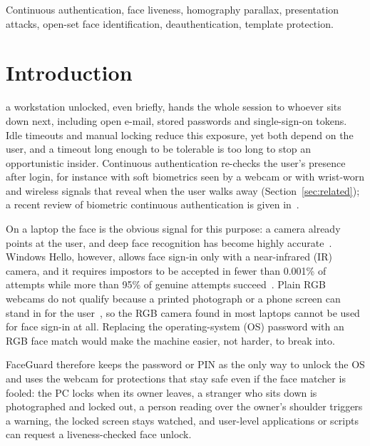 \documentclass[journal]{IEEEtran}
\newcommand{\sys}{FaceGuard}
\begin{document}
\begin{IEEEkeywords}
Continuous authentication, face liveness, homography parallax, presentation attacks, open-set face identification, deauthentication, template protection.
\end{IEEEkeywords}

\section{Introduction}
 a workstation unlocked, even briefly, hands the whole session to whoever sits down next, including open e-mail, stored passwords and single-sign-on tokens. Idle timeouts and manual locking reduce this exposure, yet both depend on the user, and a timeout long enough to be tolerable is too long to stop an opportunistic insider. Continuous authentication re-checks the user's presence after login, for instance with soft biometrics seen by a webcam or with wrist-worn and wireless signals that reveal when the user walks away (Section~\ref{sec:related}); a recent review of biometric continuous authentication is given in~\cite{ayeswarya2024review}.

On a laptop the face is the obvious signal for this purpose: a camera already points at the user, and deep face recognition has become highly accurate~\cite{deng2019arcface}. Windows Hello, however, allows face sign-in only with a near-infrared (IR) camera, and it requires impostors to be accepted in fewer than 0.001\% of attempts while more than 95\% of genuine attempts succeed~\cite{ms2024hello}. Plain RGB webcams do not qualify because a printed photograph or a phone screen can stand in for the user~\cite{zhang2012casiafasd}, so the RGB camera found in most laptops cannot be used for face sign-in at all. Replacing the operating-system (OS) password with an RGB face match would make the machine easier, not harder, to break into.

\sys{} therefore keeps the password or PIN as the only way to unlock the OS and uses the webcam for protections that stay safe even if the face matcher is fooled: the PC locks when its owner leaves, a stranger who sits down is photographed and locked out, a person reading over the owner's shoulder triggers a warning, the locked screen stays watched, and user-level applications or scripts can request a liveness-checked face unlock.
\end{document}
